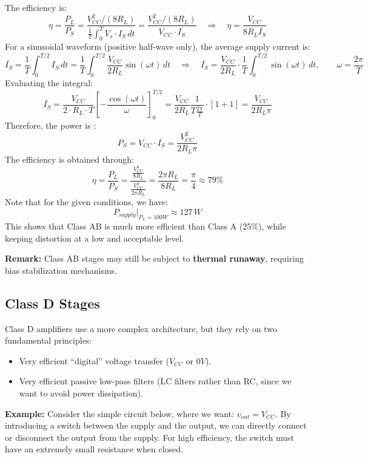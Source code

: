 The efficiency is:
\[
\eta = \frac{P_L}{P_S} 
= \frac{V_{CC}^2 / (8 R_L)}{\frac{1}{T} \int_0^T V_{s} \cdot I_S \, dt}
= \frac{{V}_{CC}^2 / (8R_L)}{V_{CC} \cdot \overline{I_S}}
\quad \Rightarrow \quad 
\eta = \frac{{V}_{CC}}{8 R_L \overline{I_S}}
\]
For a sinusoidal waveform (positive half-wave only), the average supply current is:
\[
\overline{I_S} = \frac{1}{T} \int_0^{T/2} I_S \, dt
=
\frac{1}{T} \int_0^{T/2} \frac{V_{CC}}{2R_L}\sin(\omega t) \, dt
\quad \Rightarrow \quad
\overline{I_S}= \frac{V_{CC}}{2R_L} \cdot \frac{1}{T} \int_0^{T/2} \sin(\omega t) \, dt, \qquad \omega = \frac{2 \pi}{T}
\]
Evaluating the integral:
\[
\overline{I_S} = \frac{V_{CC}}{2 \cdot R_L \cdot T} \left[-\frac{\cos(\omega t)}{\omega} \right]_0^{T/2}
= \frac{V_{CC}}{2R_L} \frac{1}{T \tfrac{2 \pi}{T}}\cdot [1 + 1]
= \frac{V_{CC}}{2 R_L \pi}
\]
Therefore, the power is : 
\[
P_S = V_{CC} \cdot \overline{I_S} = \frac{V_{CC}^2}{2 R_L \pi}
\]
The efficiency is obtained through: 
\[
\eta = \frac{P_L}{P_S}
= \frac{\frac{V_{CC}^2}{8R_L}}{\frac{V_{CC}^2}{2 \pi R_L }}
= \frac{2 \pi R_L}{8 R_L} = \frac{\pi}{4} \approx 79 \%
\]
Note that for the given conditions, we have:
\[
P_{supply}|_{P_L=100W} \approx 127 \, W
\]
This shows that Class AB is much more efficient than Class A (25\%), while keeping distortion at a low and acceptable level.

\textbf{Remark:}
Class AB stages may still be subject to \textbf{thermal runaway}, requiring bias stabilization mechanisms.


\subsection{Class D Stages}

Class D amplifiers use a more complex architecture, but they rely on two fundamental principles:
\begin{itemize}
    \item Very efficient ``digital'' voltage transfer ($V_{CC}$ or $0V$).  
    \item Very efficient passive low-pass filters (LC filters rather than RC, since we want to avoid power dissipation).  
\end{itemize}

\textbf{Example:}
Consider the simple circuit below, where we want:
$v_{out} = V_{CC}$. By introducing a switch between the supply and the output, we can directly connect or disconnect the output from the supply.  
For high efficiency, the switch must have an extremely small resistance when closed.  

